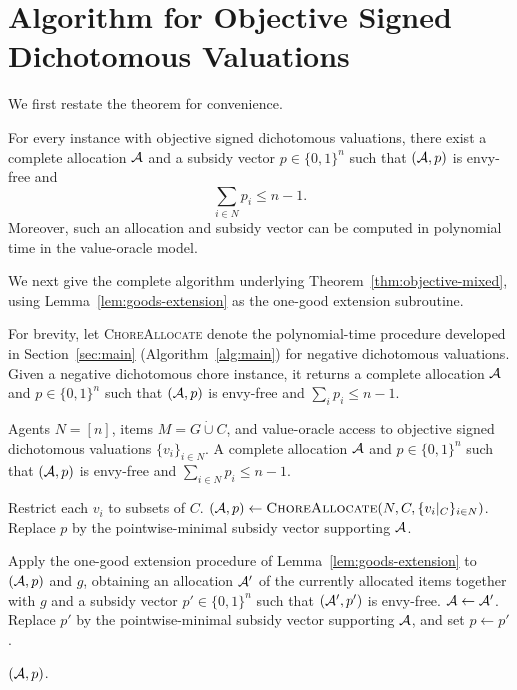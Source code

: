 \section{Algorithm for Objective Signed Dichotomous Valuations}
\label{app:objective-mixed-alg}
We first restate the theorem for convenience.
\renewcommand{\restatedname}{Theorem~\ref{thm:objective-mixed}}
\begin{restated}
For every instance with objective signed dichotomous valuations, there exist a complete allocation $\mathcal{A}$ and a subsidy vector $p\in\{0,1\}^n$ such that $(\mathcal{A},p)$ is envy-free and
\[
\sum_{i\in N} p_i\leq n-1.
\]
Moreover, such an allocation and subsidy vector can be computed in
polynomial time in the value-oracle model.
\end{restated}
We next give the complete algorithm underlying Theorem~\ref{thm:objective-mixed}, using Lemma~\ref{lem:goods-extension} as the one-good extension subroutine.

For brevity, let \textsc{ChoreAllocate} denote the polynomial-time procedure developed in Section~\ref{sec:main} (Algorithm~\ref{alg:main}) for negative dichotomous valuations. Given a negative dichotomous chore instance, it returns a complete allocation $\mathcal{A}$ and $p\in\{0,1\}^n$ such that $(\mathcal{A},p)$ is envy-free and $\sum_i p_i\le n-1$.

\begin{algorithm}[H]
\caption{Unit subsidies for objective signed dichotomous valuations}
\label{alg:objective-mixed}
\begin{algorithmic}[1]
\Require Agents $N=[n]$, items $M=G\mathbin{\dot\cup}C$, and value-oracle access to objective signed dichotomous valuations $\{v_i\}_{i\in N}$.
\Ensure A complete allocation $\mathcal{A}$ and $p\in\{0,1\}^n$ such that $(\mathcal{A},p)$ is envy-free and $\sum_{i\in N}p_i\le n-1$.

\State Restrict each $v_i$ to subsets of $C$.
\State $(\mathcal{A},p)\gets\textsc{ChoreAllocate}(N,C,\{v_i|_C\}_{i\in N})$.
\State Replace $p$ by the pointwise-minimal subsidy vector supporting $\mathcal{A}$.

    \State Apply the one-good extension procedure of Lemma~\ref{lem:goods-extension} to $(\mathcal{A},p)$ and $g$, obtaining an allocation $\mathcal{A}'$ of the currently allocated items together with $g$ and a subsidy vector $p'\in\{0,1\}^n$ such that $(\mathcal{A}',p')$ is envy-free.
    \State $\mathcal{A}\gets\mathcal{A}'$.
    \State Replace $p'$ by the pointwise-minimal subsidy vector supporting $\mathcal{A}$, and set $p\gets p'$.
\EndFor

\State \Return $(\mathcal{A},p)$.
\end{algorithmic}
\end{algorithm}

